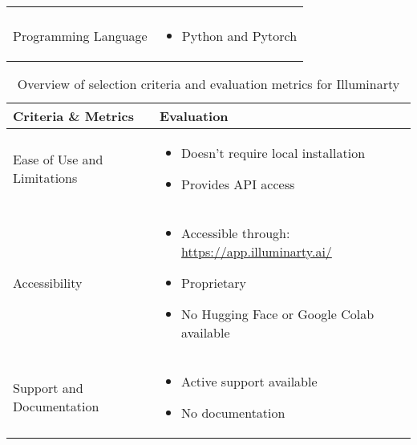 \begin{table}[htpb]
\begin{tabularx}{\textwidth}{l X}
\begin{itemize}
		                               \end{itemize}                    \\
		\addlinespace
		Programming Language         & \begin{itemize}
			                               \item Python and Pytorch
		                               \end{itemize}                                                            \\
		\bottomrule
	\end{tabularx}
\end{table}

\begin{table}[htpb]
	\caption{Overview of selection criteria and evaluation metrics for Illuminarty}\label{tab:illuminarty-overview}
	\centering
	\small
	\begin{tabularx}{\textwidth}{l X}
		\toprule
		\textbf{Criteria \& Metrics} & \textbf{Evaluation}                                        \\
		\midrule
		Ease of Use and Limitations  & \begin{itemize}
			                               \item Doesn't require local installation
			                               \item Provides \ac{API} access
		                               \end{itemize}                    \\
		\addlinespace
		Accessibility                & \begin{itemize}
			                               \item Accessible through: \url{https://app.illuminarty.ai/}
			                               \item Proprietary
			                               \item No Hugging Face or Google Colab available
		                               \end{itemize} \\
		\addlinespace
		Support and Documentation    & \begin{itemize}
			                               \item Active support available
			                               \item No documentation
		                               \end{itemize}                              \\

\end{tabularx}
\end{table}
